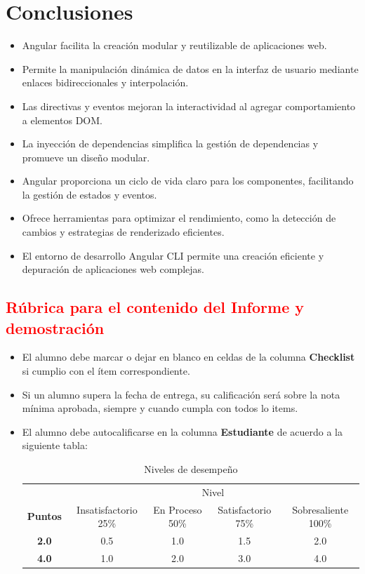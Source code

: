 \documentclass{article}
\begin{document}
  \section{Conclusiones}
  \begin{itemize}
    \item Angular facilita la creación modular y reutilizable de aplicaciones web.
    \item Permite la manipulación dinámica de datos en la interfaz de usuario mediante enlaces bidireccionales y interpolación.
    \item Las directivas y eventos mejoran la interactividad al agregar comportamiento a elementos DOM.
    \item La inyección de dependencias simplifica la gestión de dependencias y promueve un diseño modular.
    \item Angular proporciona un ciclo de vida claro para los componentes, facilitando la gestión de estados y eventos.
    \item Ofrece herramientas para optimizar el rendimiento, como la detección de cambios y estrategias de renderizado 
    eficientes.
    \item El entorno de desarrollo Angular CLI permite una creación eficiente y depuración de aplicaciones web complejas.
  \end{itemize}


	\newpage
	\subsection{\textcolor{red}{Rúbrica para el contenido del Informe y demostración}}
	\begin{itemize}			
		\item El alumno debe marcar o dejar en blanco en celdas de la columna \textbf{Checklist} si cumplio con el ítem correspondiente.
		\item Si un alumno supera la fecha de entrega,  su calificación será sobre la nota mínima aprobada, siempre y cuando cumpla con todos lo items.
		\item El alumno debe autocalificarse en la columna \textbf{Estudiante} de acuerdo a la siguiente tabla:
	
		\begin{table}[ht]
			\caption{Niveles de desempeño}
			\begin{center}
			\begin{tabular}{ccccc}
    			\hline
    			 & \multicolumn{4}{c}{Nivel}\\
    			\cline{1-5}
    			\textbf{Puntos} & Insatisfactorio 25\%& En Proceso 50\% & Satisfactorio 75\% & Sobresaliente 100\%\\
    			\textbf{2.0}&0.5&1.0&1.5&2.0\\
    			\textbf{4.0}&1.0&2.0&3.0&4.0\\
    		\hline
			\end{tabular}
		\end{center}
	\end{table}	
	

	\end{itemize}
\end{document}
